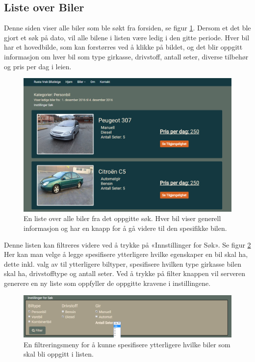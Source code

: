 \subsection{Liste over Biler}
Denne siden viser alle biler som ble søkt fra forsiden, se figur \ref{fig:rv_carlist}. Dersom et det ble gjort et søk på dato, vil alle bilene i listen være ledig i den gitte periode. Hver bil har et hovedbilde, som kan forstørres ved å klikke på bildet, og det blir oppgitt informasjon om hver bil som type girkasse, drivstoff, antall seter, diverse tilbehør og pris per dag i leien. 

 \begin{figure}[htbp]
	\centering
		\includegraphics[scale=0.5]{Bilder/rv_carlist.png}
	\caption[Liste over Biler]{En liste over alle biler fra det oppgitte søk. Hver bil viser generell informasjon og har en knapp for å gå videre til den spesifikke bilen. } %
	\label{fig:rv_carlist}
\end{figure}

Denne listen kan filtreres videre ved å trykke på «Innstillinger for Søk». Se figur \ref{fig:rv_carlist_filter} Her kan man velge å legge spesifisere ytterligere hvilke egenskaper en bil skal ha, dette inkl. valg av til ytterligere biltyper, spesifisere hvilken type girkasse bilen skal ha, drivstofftype og antall seter. Ved å trykke på filter knappen vil serveren generere en ny liste som oppfyller de oppgitte kravene i instillingene.

 \begin{figure}[htbp]
	\centering
		\includegraphics[scale=0.5]{Bilder/rv_carlist_filter.png}
	\caption[Instillinger for Søk]{En filtreringsmeny for å kunne spesifisere ytterligere hvilke biler som skal bli oppgitt i listen.} %
	\label{fig:rv_carlist_filter}
\end{figure}



